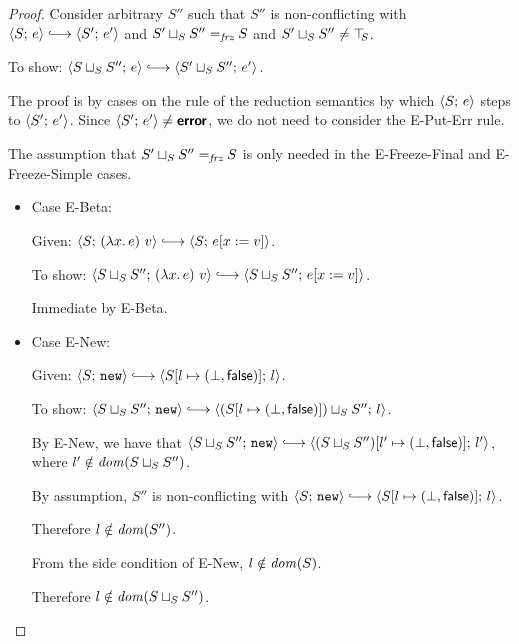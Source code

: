\begin{proof}

  Consider arbitrary $S''$ such that $S''$ is non-conflicting with
  $\config{S}{e} \parstepsto \config{S'}{e'}$ and $S' \sqcup_{S} S''
  =_{\textit{frz}} S$ and $S' \sqcup_{S} S'' \neq \top\hspace{-0.85mm}_{S}$.

  To show: $\config{\lubstore{S}{S''}}{e} \parstepsto
  \config{\lubstore{S'}{S''}}{e'}$.

  The proof is by cases on the rule of the reduction semantics by
  which $\langle S;\, e \rangle$ steps to $\langle S';\, e' \rangle$.  Since
  $\langle S';\, e' \rangle \neq \textbf{\textsf{error}}$, we do not need to consider the {\sc
    E-Put-Err} rule.

  The assumption that $S' \sqcup_{S} S'' =_{\textit{frz}} S$ is only needed
  in the {\sc E-Freeze-Final} and {\sc E-Freeze-Simple} cases.

  \begin{itemize}

    \item Case {\sc E-Beta}:

      Given: $\config{S}{\app{(\lam{x}{e})}{v}} \parstepsto
      \config{S}{\subst{e}{x}{v}}$.

      To show: $\config{\lubstore{S}{S''}}{\app{(\lam{x}{e})}{v}} \parstepsto
      \config{\lubstore{S}{S''}}{\subst{e}{x}{v}}$.

      Immediate by {\sc E-Beta}.

    \item Case {\sc E-New}:

      Given: $\config{S}{\NEW} \parstepsto
      \config{\extS{S}{l}{\bot}{\frozenfalse}}{l}$.

      To show: $\config{\lubstore{S}{S''}}{\NEW} \parstepsto
      \config{\lubstore{(\extS{S}{l}{\bot}{\frozenfalse})}{S''}}{l}$.

      By {\sc E-New}, we have that $\config{\lubstore{S}{S''}}{\NEW}
      \parstepsto
      \config{\extS{(\lubstore{S}{S''})}{l'}{\bot}{\frozenfalse}}{l'}$,
      where $l' \notin \mathit{dom}(S \sqcup_{S} S'')$.

      By assumption, $S''$ is non-conflicting with $\config{S}{\NEW}
      \parstepsto \config{\extS{S}{l}{\bot}{\frozenfalse}}{l}$.

      Therefore $l \notin \mathit{dom}(S'')$.

      From the side condition of {\sc E-New}, $l \notin \mathit{dom}(S)$.

      Therefore $l \notin \mathit{dom}(S \sqcup_{S} S'')$.


\end{itemize}
\end{proof}
